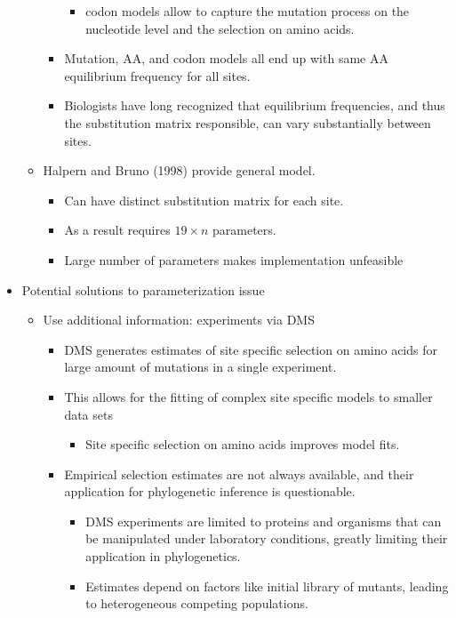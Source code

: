 \documentclass[12pt]{article}
\begin{document}
\begin{itemize}
\begin{itemize}
\begin{itemize}
\begin{itemize}
				\item codon models allow to capture the mutation process on the nucleotide level and the selection on amino acids.
			\end{itemize}
			\item Mutation, AA, and codon models all end up with same AA equilibrium frequency for all sites.
			\item Biologists have long recognized that equilibrium frequencies, and thus the substitution matrix responsible, can vary substantially between sites.
		\end{itemize}
		\item Halpern and Bruno (1998) provide general model.
		\begin{itemize}
			\item Can have distinct substitution matrix for each site.
			\item As a result requires $19 \times n$ parameters.
			\item Large number of parameters makes implementation unfeasible
		\end{itemize}
	\end{itemize}
	\item Potential solutions to parameterization issue
	\begin{itemize}
		\item Use additional information: experiments via DMS
		\begin{itemize}
			\item DMS generates estimates of site specific selection on amino acids for large amount of mutations in a single experiment.
			\item This allows for the fitting of complex site specific models to smaller data sets
			\begin{itemize}
				\item Site specific selection on amino acids improves model fits.
			\end{itemize}
			\item Empirical selection estimates are not always available, and their application for phylogenetic inference is questionable.
			\begin{itemize}
				\item DMS experiments are limited to proteins and organisms that can be manipulated under laboratory conditions, greatly limiting their application in phylogenetics.
				\item Estimates depend on factors like initial library of mutants, leading to heterogeneous competing populations.

\end{itemize}
\end{itemize}
\end{itemize}
\end{itemize}
\end{document}
